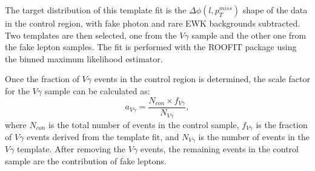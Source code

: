 \documentclass[thesis.tex]{subfiles}
\renewcommand\_{\textunderscore\allowbreak}
\begin{document}
The target distribution of this template fit is the $\Delta\phi(l,p_{T}^{miss})$ shape of the data in the control region, with fake photon and rare EWK backgrounds subtracted. Two templates are then selected, one from the $V\gamma$ sample and the other one from the fake lepton samples. The fit is performed with the ROOFIT package using the binned maximum likelihood estimator.

Once the fraction of $V\gamma$ events in the control region is determined, the scale factor for the $V\gamma$ sample can be calculated as: 
\begin{equation}
 		a_{V\gamma} = \frac{N_{con}\times f_{V\gamma}}{N_{V\gamma}}, 
\end{equation}
where $N_{con}$ is the total number of events in the control sample, $f_{V\gamma}$ is the fraction of $V\gamma$ events derived from the template fit, and $N_{V\gamma}$ is the number of events in the $V\gamma$ template. After removing the $V\gamma$ events, the remaining events in the control sample are the contribution of fake leptons. 

\end{document}
